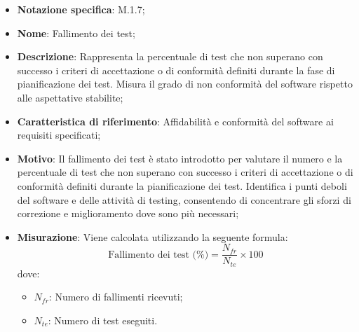 \begin{itemize}
    \item \textbf{Notazione specifica}: M.1.7;
    \item \textbf{Nome}: Fallimento dei test;
    \item \textbf{Descrizione}: Rappresenta la percentuale di test che non superano con successo i criteri di accettazione o di conformità definiti durante la fase di pianificazione dei test. Misura il grado di non conformità del software rispetto alle aspettative stabilite;
    \item \textbf{Caratteristica di riferimento}: Affidabilità e conformità del software ai requisiti specificati;
    \item \textbf{Motivo}: Il fallimento dei test è stato introdotto per valutare il numero e la percentuale di test che non superano con successo i criteri di accettazione o di conformità definiti durante la pianificazione dei test. Identifica i punti deboli del software e delle attività di testing, consentendo di concentrare gli sforzi di correzione e miglioramento dove sono più necessari;
    \item \textbf{Misurazione}: Viene calcolata utilizzando la seguente formula:
    \[
    \text{Fallimento dei test (\%)} = \frac{N_{fr}}{N_{te}} \times 100
    \]
    dove:
    \begin{itemize}
        \item $N_{fr}$: Numero di fallimenti ricevuti;
        \item $N_{te}$: Numero di test eseguiti.
    \end{itemize}
\end{itemize}